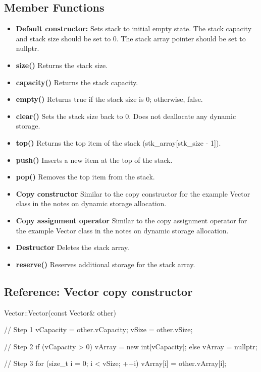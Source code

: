 \documentclass{report}
\begin{document}
    \subsection{Member Functions}
    \begin{itemize}
        \item \textbf{Default constructor:} Sets stack to initial empty state. The stack capacity and stack size should be set to 0. The stack array pointer should be set to nullptr.
        \item \textbf{size()} Returns the stack size.
        \item \textbf{capacity()} Returns the stack capacity.
        \item \textbf{empty()} Returns true if the stack size is 0; otherwise, false.
        \item \textbf{clear()} Sets the stack size back to 0. Does not deallocate any dynamic storage.
        \item \textbf{top()} Returns the top item of the stack (stk\_array[stk\_size - 1]).
        \item \textbf{push()} Inserts a new item at the top of the stack.
        \item \textbf{pop()} Removes the top item from the stack.
        \item \textbf{Copy constructor} Similar to the copy constructor for the example Vector class in the notes on dynamic storage allocation.
        \item \textbf{Copy assignment operator} Similar to the copy assignment operator for the example Vector class in the notes on dynamic storage allocation.
        \item \textbf{Destructor} Deletes the stack array.
        \item \textbf{reserve()} Reserves additional storage for the stack array.
    \end{itemize}
    \bigbreak \noindent 
    \subsection{Reference: Vector copy constructor}
    \bigbreak \noindent 
    \begin{cppcode}
        Vector::Vector(const Vector& other)
        {
            // Step 1
            vCapacity = other.vCapacity;
            vSize = other.vSize;

            // Step 2
            if (vCapacity > 0)
            vArray = new int[vCapacity];
            else
            vArray = nullptr;

            // Step 3
            for (size_t i = 0; i < vSize; ++i)
            vArray[i] = other.vArray[i];
        }
    \end{cppcode}
\end{document}
